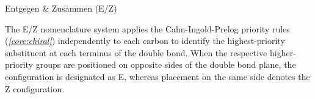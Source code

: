\documentclass[10pt]{article}
\begin{document}
      \begin{core}{Entgegen \& Zusammen (E/Z)}

        The E/Z nomenclature system applies the Cahn-Ingold-Prelog priority rules (\textit{\autoref{core:chiral}}) independently to each  carbon to identify the highest-priority substituent at each terminus of the double bond. When the respective higher-priority groups are positioned on opposite sides of the double bond plane, the configuration is designated as E, whereas placement on the same side denotes the Z configuration.

        \vspace{-1.5cm}

      \end{core}

\end{document}
